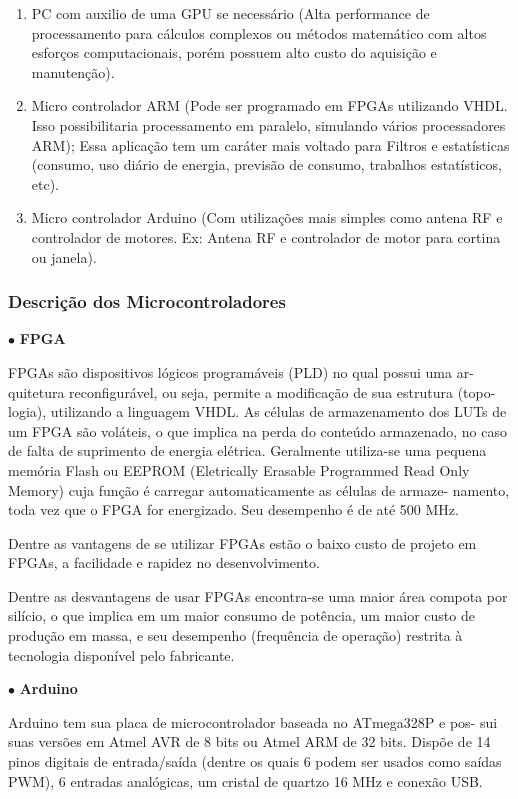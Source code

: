 \begin{enumerate}
	\item PC com auxilio de uma GPU se necessário (Alta performance de processamento para cálculos complexos ou métodos matemático com altos esforços computacionais, porém possuem alto custo do aquisição e manutenção).
	\item Micro controlador ARM (Pode ser programado em FPGAs utilizando VHDL. Isso possibilitaria processamento em paralelo, simulando vários processadores ARM); Essa aplicação tem um caráter mais voltado para Filtros e estatísticas (consumo, uso diário de energia, previsão de consumo, trabalhos estatísticos, etc).
	\item Micro controlador Arduino (Com utilizações mais simples como antena RF e controlador de motores. Ex: Antena RF e controlador de motor para cortina ou janela).
\end{enumerate}

\subsubsection{Descrição dos Microcontroladores}

$\bullet$ \textbf{FPGA}

	FPGAs são dispositivos lógicos programáveis (PLD) no qual possui uma ar- quitetura reconfigurável, ou seja, permite a modificação de sua estrutura (topo- logia), utilizando a linguagem VHDL. As células de armazenamento dos LUTs de um FPGA são voláteis, o que implica na perda do conteúdo armazenado, no caso de falta de suprimento de energia elétrica. Geralmente utiliza-se uma pequena memória Flash ou EEPROM (Eletrically Erasable Programmed Read Only Memory) cuja função é carregar automaticamente as células de armaze- namento, toda vez que o FPGA for energizado. Seu desempenho é de até 500 MHz.

	Dentre as vantagens de se utilizar FPGAs estão o baixo custo de projeto em FPGAs, a facilidade e rapidez no desenvolvimento.

	Dentre as desvantagens de usar FPGAs encontra-se uma maior área compota por silício, o que implica em um maior consumo de potência, um maior custo de produção em massa, e seu desempenho (frequência de operação) restrita à tecnologia disponível pelo fabricante.

$\bullet$ \textbf{Arduino}

	Arduino tem sua placa de microcontrolador baseada no ATmega328P e pos- sui suas versões em Atmel AVR de 8 bits ou Atmel ARM de 32 bits. Dispõe de 14 pinos digitais de entrada/saída (dentre os quais 6 podem ser usados como saídas PWM), 6 entradas analógicas, um cristal de quartzo 16 MHz e conexão USB.

